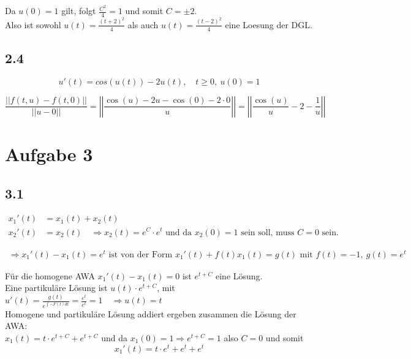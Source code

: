 \documentclass[10pt,oneside,a4paper]{scrartcl}
\begin{document}
		Da $u(0) = 1$ gilt, folgt $\frac{C^2}{4} = 1$ und somit $C=\pm 2$.\\
		Also ist sowohl $u(t) = \frac{(t+2)^2}{4}$ als auch  $u(t) = \frac{(t-2)^2}{4}$ eine Loesung der DGL.


 		\subsection*{2.4}

		\begin{equation*}
			u'(t) = cos(u(t)) - 2u(t),\quad t \geq 0, \ u(0) = 1
		\end{equation*}

		\begin{equation*}
			 \frac{||f(t,u) - f(t,0)||}{ ||u - 0|| } = \left | \left | \frac{\cos(u) - 2u - \cos(0) - 2 \cdot 0}{u} \right| \right| =  \left | \left | \frac{\cos(u)}{u} - 2 - \frac{1}{u} \right| \right|
		\end{equation*}




	\section*{Aufgabe 3}

  		\subsection*{3.1}

		\begin{align*}    	
		x_{1}'(t) & = x_{1}(t) + x_{2}(t)\\
		x_{2}'(t) & = x_{2}(t) \quad  \Rightarrow x_{2}(t) = e^C \cdot e^t \text{ und da } x_2(0) = 1 \text{ sein soll, muss } C = 0 \text { sein. } 
		\end{align*}

		\begin{align*}
		\Rightarrow  x_{1}'(t)  - x_{1}(t) = e^t  \text { ist von der Form }  x_{1}'(t)  + f(t)x_{1}(t) = g(t) \text{ mit } f(t) = -1, \ g(t) = e^t
		\end{align*}

		Für die homogene AWA $ x_{1}'(t)  - x_{1}(t) = 0$ ist $e^{t+C}$ eine Lösung.\\ Eine partikuläre Lösung ist $u(t) \cdot e^{t + C}$, mit $u'(t) = \frac{g(t)}{e^{\int -F(t)dt}} = \frac{e^t}{e^t} = 1 \quad \Rightarrow u(t) = t$ \\ Homogene und partikuläre Lösung addiert ergeben zusammen die Lösung der AWA: \\ $x_1(t) = t  \cdot e^{t + C} + e^{t + C}$ und da $x_1(0) = 1 \Rightarrow e^{t+C} = 1$ also $C=0$ und somit
		\begin{equation*}
		x_1'(t) = t \cdot e^{t } + e^{t} + e^{t} 
		\end{equation*}
\end{document}
